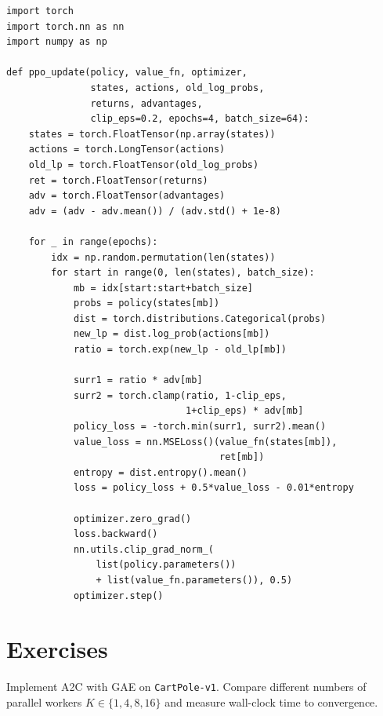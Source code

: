 \begin{codeblock}[title=\textbf{PPO (Simplified)}]
\begin{verbatim}
import torch
import torch.nn as nn
import numpy as np

def ppo_update(policy, value_fn, optimizer,
               states, actions, old_log_probs,
               returns, advantages,
               clip_eps=0.2, epochs=4, batch_size=64):
    states = torch.FloatTensor(np.array(states))
    actions = torch.LongTensor(actions)
    old_lp = torch.FloatTensor(old_log_probs)
    ret = torch.FloatTensor(returns)
    adv = torch.FloatTensor(advantages)
    adv = (adv - adv.mean()) / (adv.std() + 1e-8)

    for _ in range(epochs):
        idx = np.random.permutation(len(states))
        for start in range(0, len(states), batch_size):
            mb = idx[start:start+batch_size]
            probs = policy(states[mb])
            dist = torch.distributions.Categorical(probs)
            new_lp = dist.log_prob(actions[mb])
            ratio = torch.exp(new_lp - old_lp[mb])

            surr1 = ratio * adv[mb]
            surr2 = torch.clamp(ratio, 1-clip_eps,
                                1+clip_eps) * adv[mb]
            policy_loss = -torch.min(surr1, surr2).mean()
            value_loss = nn.MSELoss()(value_fn(states[mb]),
                                      ret[mb])
            entropy = dist.entropy().mean()
            loss = policy_loss + 0.5*value_loss - 0.01*entropy

            optimizer.zero_grad()
            loss.backward()
            nn.utils.clip_grad_norm_(
                list(policy.parameters())
                + list(value_fn.parameters()), 0.5)
            optimizer.step()
\end{verbatim}
\end{codeblock}

\section{Exercises}
\label{sec:ac:exercises}

\begin{exercise}[A2C Implementation]
Implement A2C with GAE on \texttt{CartPole-v1}. Compare different
numbers of parallel workers $K \in \{1, 4, 8, 16\}$ and measure
wall-clock time to convergence.
\end{exercise}

